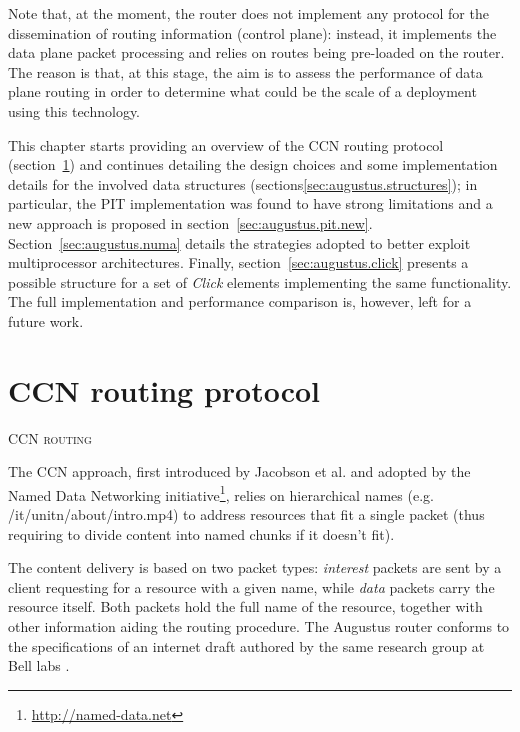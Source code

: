 \documentclass[11pt,a4paper,twoside,titlepage,openany]{book}
\newcommand{\mono}[1]{{\footnotesize \ttfamily #1}}
\begin{document}
Note that, at the moment, the router does not implement any protocol for the dissemination of routing information (control plane): instead, it implements the data plane packet processing and relies on routes being pre-loaded on the router. The reason is that, at this stage, the aim is to assess the performance of data plane routing in order to determine what could be the scale of a deployment using this technology.

This chapter starts providing an overview of the CCN routing protocol (section~\ref{sec:augustus.ccn}) and continues detailing the design choices and some implementation details for the involved data structures (sections\ref{sec:augustus.structures});
in particular, the \gls{PIT} implementation was found to have strong limitations and a new approach is proposed in section~\ref{sec:augustus.pit.new}.
Section~\ref{sec:augustus.numa} details the strategies adopted to better exploit multiprocessor architectures.
Finally, section~\ref{sec:augustus.click} presents a possible structure for a set of \emph{Click} elements implementing the same functionality. The full implementation and performance comparison is, however, left for a future work.

\section{CCN routing protocol}\label{sec:augustus.ccn}
\begin{algorithm}[htb]
  \DontPrintSemicolon
  \caption[CCN routing]{\textsc{CCN routing}}
  \label{algo:routing}
\end{algorithm}

The \gls{CCN} approach, first introduced by Jacobson et al. \cite{ccn} and adopted by the Named Data Networking initiative\footnote{\url{http://named-data.net}}, relies on hierarchical names (e.g. \mono{/it/unitn/about/intro.mp4}) to address resources that fit a single packet (thus requiring to divide content into named chunks if it doesn't fit).

The content delivery is based on two packet types: \emph{interest} packets are sent by a client requesting for a resource with a given name, while \emph{data} packets carry the resource itself. Both packets hold the full name of the resource, together with other information aiding the routing procedure.
The Augustus router conforms to the specifications of an internet draft authored by the same research group at Bell labs \cite{icn-packet}.
\end{document}

